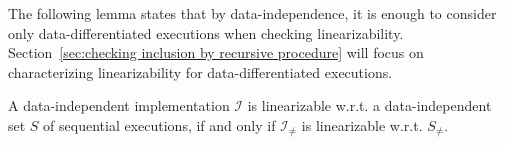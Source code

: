 The following lemma states that by data-independence, it is enough to consider only data-differentiated executions when checking linearizability. %
Section~\ref{sec:checking inclusion by recursive procedure} will focus on characterizing linearizability for data-differentiated executions. %

\begin{lemma}\label{lemma:data differentiated is enough for PQ}
A data-independent implementation $\mathcal{I}$ is linearizable w.r.t. a data-independent set $S$ of sequential executions, if and only if $\mathcal{I}_{\neq}$ is linearizable w.r.t. $S_{\neq}$.
\end{lemma}


